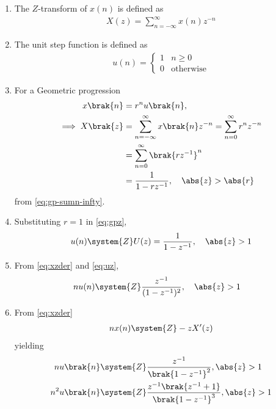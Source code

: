 \begin{enumerate}[label=\thesubsection.\arabic*,ref=\thesubsection.\theenumi]
\item 
	The $Z$-transform of $x(n)$ is defined as
\begin{align}
X(z) = \sum_{n=-\infty}^{\infty}x(n)z^{-n}
\label{eq:ztrans}
\end{align}
\item The unit step function is defined as
\begin{align}
	u(n) = 
	\begin{cases}
		1 & n \ge 0
		\\
		0 & \text{otherwise}
	\end{cases}
	\label{eq:unit-step}
\end{align}
\item For a Geometric progression 
\begin{align}
	       \label{eq:gpn}
	x\brak{n} &=r^nu\brak{n},
	\\
         \implies      X\brak{z} &= \sum_{n=-\infty}^{\infty}x\brak{n}z^{-n}
               =\sum_{n=0}^{\infty}r^nz^{-n}\\
                &=\sum_{n=0}^{\infty}\brak{rz^{-1}}^n\\
               &= \frac{1}{1-rz^{-1}}, \quad \abs{z}>\abs{r} 
	       \label{eq:gpz}
\end{align}
from 
	\eqref{eq:gp-sumn-infty}.
\item 	       Substituting $r = 1$ in \eqref{eq:gpz},
\begin{align}
	u(n) \system{Z}	U(z) = 
                \frac{1}{1-z^{-1}}, \quad \abs{z}>1
	       \label{eq:uz}
\end{align}
\item From 
\eqref{eq:xzder}
	       and 
	       \eqref{eq:uz},
\begin{align}
nu(n) &\system{Z}\frac{z^{-1}}{(1-z^{-1})^{2}}, \quad \abs{z} > 1 
	       \label{eq:uzder}
\end{align}
\item 
From \eqref{eq:xzder}
\begin{align}
	nx(n) \system{Z} -zX^{\prime}(z)
\label{eq:xzder}
\end{align}
yielding
\begin{align}
    n u\brak{n} & \system{Z} \frac{z^{-1}}{\brak{1-z^{-1}}^2} ,   \abs{z} >1 \label{eq:11.9.5.26.2}\\
         n^2 u\brak{n} & \system{Z} \frac{z^{-1}\brak{z^{-1}+1}}{\brak{1-z^{-1}}^3} ,  \abs{z} > 1\label{eq:11.9.5.26.3}\\

\end{align}
\end{enumerate}
